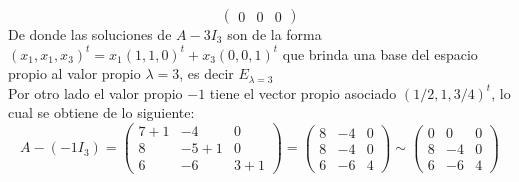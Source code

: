 \documentclass[letter]{memoir} %
\begin{document}
\begin{enumerate}
\[\begin{pmatrix}
    0 & 0 & 0
    \end{pmatrix} 
\]
De donde las soluciones de $A-3I_3$ son de la forma $(x_1, x_1, x_3)^t = x_1(1,1,0)^t+x_3(0,0,1)^t $ que brinda una base del espacio propio al valor propio $\lambda = 3$, es decir $E_{\lambda = 3}$ \\
Por otro lado el valor propio $-1$ tiene el vector propio asociado $(1/2, 1, 3/4)^t$, lo cual se obtiene de lo siguiente:\\
\[
	 A-(-1I_3) = \begin{pmatrix}
    7 +1 & -4 & 0\\
    8 & -5 +1 & 0\\
    6 & -6 & 3+1
    \end{pmatrix} =
	 \begin{pmatrix}
    8 & -4 & 0\\
    8 & -4 & 0\\
    6 & -6 & 4
    \end{pmatrix} \sim
    	 \begin{pmatrix}
    0 & 0 & 0\\
    8 & -4& 0\\
    6 & -6 & 4
    \end{pmatrix} 
\]


\end{enumerate}
\end{document}

